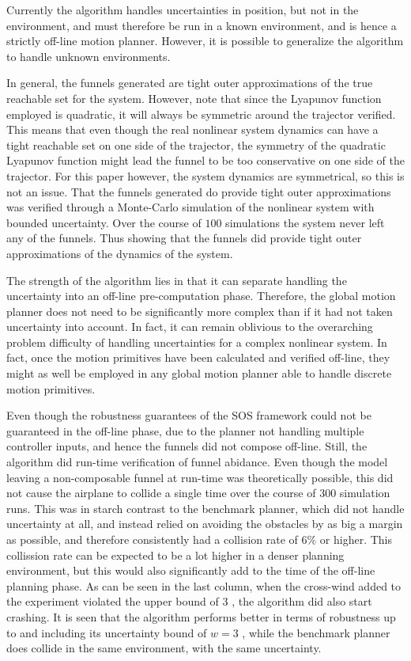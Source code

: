 
Currently the algorithm handles uncertainties in position, but not in the
environment, and must therefore be run in a known environment, and is hence a
strictly off-line motion planner. However, it is possible to generalize the
algorithm to handle unknown environments.

In general, the funnels generated are tight outer approximations of the true
reachable set for the system. However, note that since the Lyapunov function
employed is quadratic, it will always be symmetric around the trajector
verified. This means that even though the real nonlinear system dynamics can
have a tight reachable set on one side of the trajector, the symmetry of the
quadratic Lyapunov function might lead the funnel to be too conservative on one
side of the trajector. For this paper however, the system dynamics are
symmetrical, so this is not an issue. That the funnels generated do provide
tight outer approximations was verified through a Monte-Carlo simulation of the
nonlinear system with bounded uncertainty. Over the course of \(100\)
simulations the system never left any of the funnels. Thus showing that the
funnels did provide tight outer approximations of the dynamics of the system.


The strength of the algorithm lies in that it can separate handling the
uncertainty into an off-line pre-computation phase. Therefore, the global motion
planner does not need to be significantly more complex than if it had not
taken uncertainty into account. In fact, it can remain oblivious to the
overarching problem difficulty of handling uncertainties for a complex nonlinear
system. In fact, once the motion primitives have been calculated and verified
off-line, they might as well be employed in any global motion planner able to
handle discrete motion primitives.


Even though the robustness guarantees of the SOS framework could not be
guaranteed in the off-line phase, due to the planner not handling
multiple controller inputs, and hence the funnels did not compose off-line.
Still, the \rrtfunnel{} algorithm did run-time verification of funnel abidance.
Even though the model leaving a non-composable funnel at run-time was
theoretically possible, this did not cause the airplane to collide a single time
over the course of \(300\) simulation runs. This was in starch contrast to the
benchmark planner, which did not handle uncertainty at all, and instead relied
on avoiding the obstacles by as big a margin as possible, and therefore
consistently had a collision rate of \(6\%\) or higher. This collission rate can
be expected to be a lot higher in a denser planning environment, but this would
also significantly add to the time of the off-line planning phase. As can be
seen in the last column, when the cross-wind added to the experiment violated
the upper bound of \(3\) , the \rrtfunnel{} algorithm did also
start crashing. It is seen that the
\rrtfunnel{} algorithm performs better in terms of robustness up to and
including its uncertainty bound of \( w = 3 \) , while the
benchmark planner does collide in the same environment, with the same
uncertainty.

